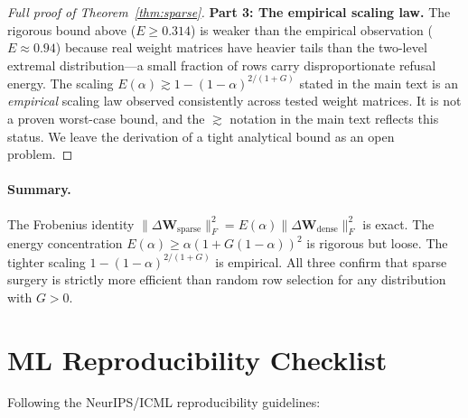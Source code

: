 \begin{proof}[Full proof of Theorem~\ref{thm:sparse}]
\textbf{Part 3: The empirical scaling law.}
The rigorous bound above ($E \geq 0.314$) is weaker than the empirical observation ($E \approx 0.94$) because real weight matrices have heavier tails than the two-level extremal distribution---a small fraction of rows carry disproportionate refusal energy.
The scaling $E(\alpha) \gtrsim 1-(1-\alpha)^{2/(1+G)}$ stated in the main text is an \emph{empirical} scaling law observed consistently across tested weight matrices.
It is not a proven worst-case bound, and the $\gtrsim$ notation in the main text reflects this status.
We leave the derivation of a tight analytical bound as an open problem.
\end{proof}

\paragraph{Summary.}
The Frobenius identity $\|\Delta\mathbf{W}_{\text{sparse}}\|_F^2 = E(\alpha)\|\Delta\mathbf{W}_{\text{dense}}\|_F^2$ is exact.
The energy concentration $E(\alpha) \geq \alpha(1+G(1-\alpha))^2$ is rigorous but loose.
The tighter scaling $1-(1-\alpha)^{2/(1+G)}$ is empirical.
All three confirm that sparse surgery is strictly more efficient than random row selection for any distribution with $G > 0$.

\section{ML Reproducibility Checklist}
\label{app:reproducibility}

Following the NeurIPS/ICML reproducibility guidelines:

